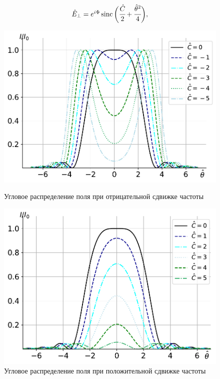 \begin{equation}
	\label{eq:field_dist_Norm}
	\begin{array}{lcl}
		\hat{E}_{\bot} = e^{i\Phi}
		\operatorname{sinc}\bigg(\cfrac{\hat{C}}{2} + 
		\cfrac{\hat{\theta}^2}{4}\bigg),
	\end{array}	
\end{equation}
\begin{figure}
	\centering  
	\begin{minipage}{0.49\textwidth}
		\centering
		\includegraphics[width=\textwidth]{pic/angleC_neg.pdf}
		\caption{Угловое распределение поля при отрицательной сдвижке частоты}
		\label{fig:angle_dist_C_neg}
	\end{minipage}\hfill
	\begin{minipage}{0.49\textwidth}
		\centering
		\includegraphics[width=\textwidth]{pic/angleC_pos.pdf}
		\caption{Угловое распределение поля при положительной сдвижке частоты}
		\label{fig:angle_dist_C_pos}
	\end{minipage}    
\end{figure}
